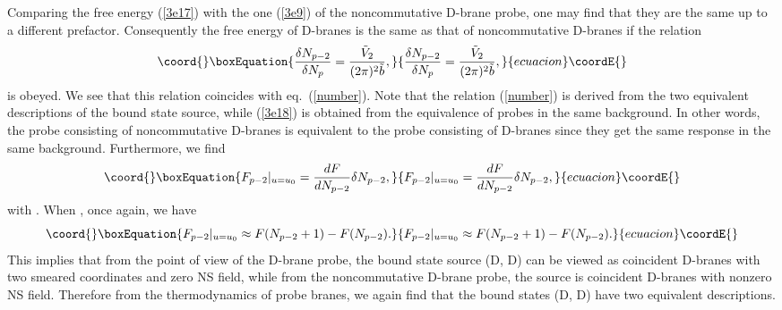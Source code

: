 \documentclass[a4paper,12pt]{article}
\begin{document}
Comparing the free energy (\ref{3e17}) with the one (\ref{3e9}) of the
noncommutative D\coordHE{}-brane probe, one may find that they are the same up to a
different prefactor. Consequently the free energy of \coordHE{}
D\coordHE{}-branes is the same as that of \coordHE{} noncommutative D\coordHE{}-branes
if the relation
\begin{equation}\coord{}\boxEquation{
\label{3e18}
\frac{\delta N_{p-2}}{\delta N_p}= \frac{\tilde{V}_2}{(2\pi)^2 \tilde{b}},
}{
\frac{\delta N_{p-2}}{\delta N_p}= \frac{\tilde{V}_2}{(2\pi)^2 \tilde{b}},
}{ecuacion}\coordE{}\end{equation}
is obeyed. We see that this relation coincides with eq.~(\ref{number}). Note
that the relation (\ref{number}) is derived from the two equivalent
descriptions of the bound state source, while (\ref{3e18}) is obtained from
the equivalence of probes in the same background. In other words, the probe
consisting of \coordHE{} noncommutative D\coordHE{}-branes is equivalent to the
probe consisting of \coordHE{} D\coordHE{}-branes since they get the same
response in the same background. Furthermore, we find
\begin{equation}\coord{}\boxEquation{
F_{p-2}|_{u=u_0}=\frac{dF}{dN_{p-2}}\delta N_{p-2},
}{
F_{p-2}|_{u=u_0}=\frac{dF}{dN_{p-2}}\delta N_{p-2},
}{ecuacion}\coordE{}\end{equation}
with \coordHE{}. When \coordHE{}, once again, we have
\begin{equation}\coord{}\boxEquation{
F_{p-2}|_{u=u_0}\approx F(N_{p-2}+1)-F(N_{p-2}).
}{
F_{p-2}|_{u=u_0}\approx F(N_{p-2}+1)-F(N_{p-2}).
}{ecuacion}\coordE{}\end{equation}
This implies that from the point of view of the D\coordHE{}-brane probe,
the bound state source (D\coordHE{}, D\coordHE{}) can be viewed as
\coordHE{} coincident D\coordHE{}-branes with two smeared coordinates and zero
NS \coordHE{} field, while from the noncommutative D\coordHE{}-brane probe, the
source is \coordHE{} coincident D\coordHE{}-branes with nonzero NS \coordHE{} field. Therefore
from the thermodynamics of probe branes, we again find that the
bound states (D\coordHE{}, D\coordHE{}) have two equivalent descriptions.
\end{document}
